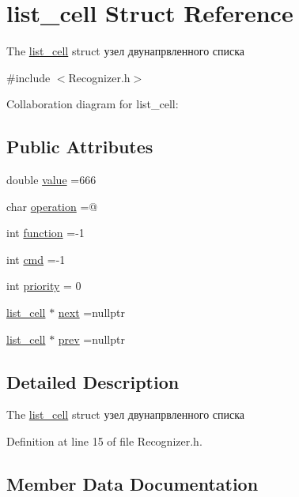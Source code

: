 \hypertarget{structlist__cell}{}\section{list\+\_\+cell Struct Reference}
\label{structlist__cell}


The \hyperlink{structlist__cell}{list\+\_\+cell} struct узел двунапрвленного списка  




{\ttfamily \#include $<$Recognizer.\+h$>$}



Collaboration diagram for list\+\_\+cell\+:
\subsection*{Public Attributes}
\begin{DoxyCompactItemize}
\item 
double \hyperlink{structlist__cell_a5f4d22d779ccc8d4fcf59b2ac35950ec}{value} =666
\item 
char \hyperlink{structlist__cell_a6ca5af01e34cada2fc702e6b5ab256f2}{operation} =\textquotesingle{}@\textquotesingle{}
\item 
int \hyperlink{structlist__cell_a983ddfbf8def7d35bcb3baac813ef99c}{function} =-\/1
\item 
int \hyperlink{structlist__cell_a291b26b04a2dacb522b0c6e781202c3c}{cmd} =-\/1
\item 
int \hyperlink{structlist__cell_afd51de45bab516a708417ccc2868595c}{priority} = 0
\item 
\hyperlink{structlist__cell}{list\+\_\+cell} $\ast$ \hyperlink{structlist__cell_a09c7a56909013720bcf26fa3208e6aa0}{next} =nullptr
\item 
\hyperlink{structlist__cell}{list\+\_\+cell} $\ast$ \hyperlink{structlist__cell_a5a88b337b902b21685daa8ab35f05c5b}{prev} =nullptr
\end{DoxyCompactItemize}


\subsection{Detailed Description}
The \hyperlink{structlist__cell}{list\+\_\+cell} struct узел двунапрвленного списка 

Definition at line 15 of file Recognizer.\+h.



\subsection{Member Data Documentation}
\hypertarget{structlist__cell_a291b26b04a2dacb522b0c6e781202c3c}{}
